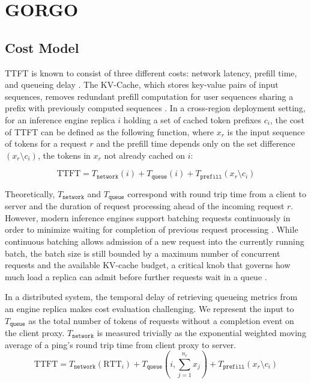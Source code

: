 \documentclass{article}
\begin{document}
\section{GORGO}
\label{sec:method}

\subsection{Cost Model}

TTFT is known to consist of three different costs: network latency, prefill time, and queueing delay \citep{banaserve2025}. The KV-Cache, which stores key-value pairs of input sequences, removes redundant prefill computation for user sequences sharing a prefix with previously computed sequences \citep{sglang2024}. In a cross-region deployment setting, for an inference engine replica $i$ holding a set of cached token prefixes $c_i$, the cost of TTFT can be defined as the following function, where $x_r$ is the input sequence of tokens for a request $r$ and the prefill time depends only on the set difference $(x_r \setminus c_i)$, the tokens in $x_r$ not already cached on $i$:

\begin{equation}
\mathrm{TTFT} = T_{\texttt{network}}(i) + T_{\texttt{queue}}(i) + T_{\texttt{prefill}}(x_r \setminus c_i)
\label{eq:ttft}
\end{equation}

Theoretically, $T_{\texttt{network}}$ and $T_{\texttt{queue}}$ correspond with round trip time from a client to server and the duration of request processing ahead of the incoming request $r$. However, modern inference engines support batching requests continuously in order to minimize waiting for completion of previous request processing \citep{orca2022}. While continuous batching allows admission of a new request into the currently running batch, the batch size is still bounded by a maximum number of concurrent requests and the available KV-cache budget, a critical knob that governs how much load a replica can admit before further requests wait in a queue \citep{vllm2023}.

In a distributed system, the temporal delay of retrieving queueing metrics from an engine replica makes cost evaluation challenging. We represent the input to $T_{\texttt{queue}}$ as the total number of tokens of requests without a completion event on the client proxy. $T_{\texttt{network}}$ is measured trivially as the exponential weighted moving average of a ping's round trip time from client proxy to server.
\begin{equation}
\mathrm{TTFT} = T_{\texttt{network}}(\mathrm{RTT}_i) + T_{\texttt{queue}}\left(i, \sum_{j=1}^{n_r} x_j\right) + T_{\texttt{prefill}}(x_r \setminus c_i)
\end{equation}
\end{document}
